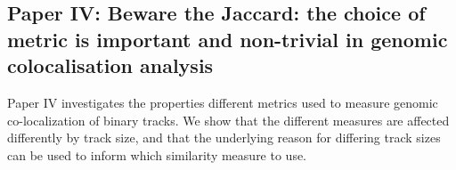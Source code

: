 \subsection{Paper IV: Beware the Jaccard: the choice of metric is important and non-trivial in genomic colocalisation analysis}
Paper IV investigates the properties different metrics used to measure genomic co-localization of binary tracks.
We show that the different measures are affected differently by track size, and that the underlying reason for differing track sizes can be used to inform which similarity measure to use.


